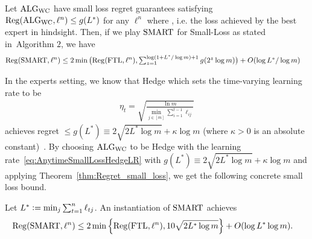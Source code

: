 \begin{theorem}  
\label{thm:Regret_small_loss}
      Let $\text{ALG}_{\text{WC}}$ have small loss regret guarantees satisfying $\mathrm{Reg}(\text{ALG}_{\text{WC}}, \ell^n) \le g(L^*)$ 
    for any $\ell^n$ where , i.e. the loss achieved by the best expert in hindsight. Then, if we play $\text{SMART}$ for Small-Loss as stated in~Algorithm $2$, we have 
    \begin{align*}
    \Reg(\bob, \ell^n) 
    &\leq 2 \min\big(\Reg(\ftl, \ell^n), \textstyle\sum_{z=1}^{\log(1+L^*/\log m) +1} g(2^z \log m)\big) + O(\log L^*/\log m)%
    \end{align*}
\end{theorem}
In the experts setting, we know that Hedge which sets the time-varying learning rate to be
\begin{align}\label{eq:AnytimeSmallLossHedgeLR}
\eta_t = \sqrt{\frac{\ln m}{\min_{j \in [m]}\sum_{i=1}^{t-1}\ell_{ij}}}
\end{align}
achieves regret $\le g(L^*) \equiv 2\sqrt{2 L^* \log m} + \kappa \log m$ (where $\kappa > 0$ is an absolute constant)~\citep{Auer--Cesa-Bianchi--Gentile2002, cesa2007improved}. By choosing $\text{ALG}_{\text{WC}}$ to be Hedge with the learning rate~\eqref{eq:AnytimeSmallLossHedgeLR} with $g(L^*) \equiv 2\sqrt{2 L^* \log m} + \kappa \log m$ and applying Theorem~\ref{thm:Regret_small_loss}, we get the following concrete small loss bound.
\begin{corollary}
\label{cor:SqrtLStarInstantiation}
    Let $L^* \mathrel{\mathop{:}}= \min_j \sum_{t=1}^n \ell_{tj}$. An instantiation of $\text{SMART}$ achieves
    \begin{align*}
        \mathrm{Reg}(\text{SMART}, \ell^n) 
        &\le 2 \min\left\{ \mathrm{Reg}(\text{FTL},\ell^n), 10 \sqrt{2L^* \log m} \right\}
        + O(\log L^* \log m). 
    \end{align*}
\end{corollary}

